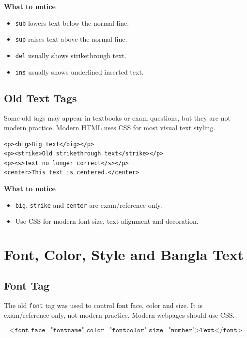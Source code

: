 \textbf{What to notice}
\begin{itemize}
    \item \texttt{sub} lowers text below the normal line.
    \item \texttt{sup} raises text above the normal line.
    \item \texttt{del} usually shows strikethrough text.
    \item \texttt{ins} usually shows underlined inserted text.
\end{itemize}

\subsection{Old Text Tags}
Some old tags may appear in textbooks or exam questions, but they are not modern practice. Modern HTML uses CSS for most visual text styling.

\begin{lstlisting}[style=htmlide, caption={Old Text Tags}]
<p><big>Big text</big></p>
<p><strike>Old strikethrough text</strike></p>
<p><s>Text no longer correct</s></p>
<center>This text is centered.</center>
\end{lstlisting}

\textbf{What to notice}
\begin{itemize}
    \item \texttt{big}, \texttt{strike} and \texttt{center} are exam/reference only.
    \item Use CSS for modern font size, text alignment and decoration.
\end{itemize}

\section{Font, Color, Style and Bangla Text}

\subsection{Font Tag}
The old \texttt{font} tag was used to control font face, color and size. It is exam/reference only, not modern practice. Modern webpages should use CSS.

\begin{formulabox}
\[
\texttt{<font face="fontname" color="fontcolor" size="number">Text</font>}
\]
\end{formulabox}

